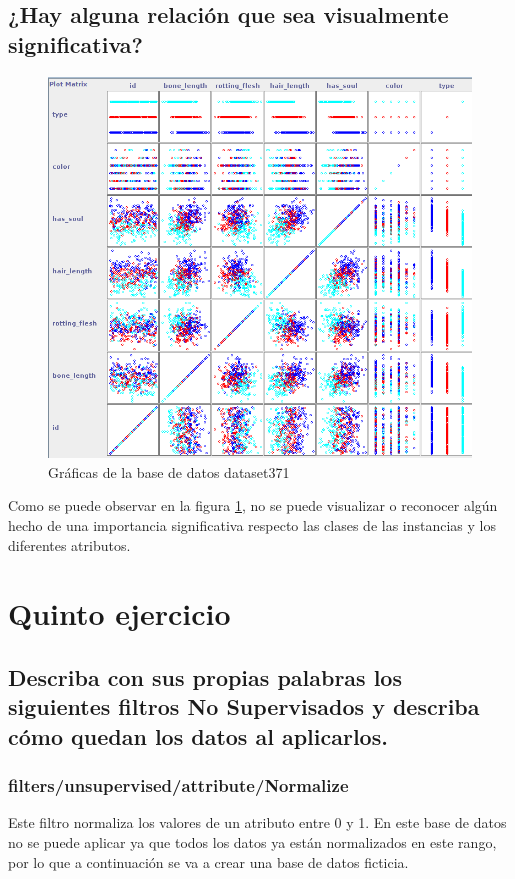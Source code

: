 \documentclass[11pt,twoside,a4paper]{book}
\begin{document}
\section{¿Hay alguna relación que sea visualmente \break significativa?}
\begin{figure}[H]
   \includegraphics[width=\textwidth]{ejercicio4_5.png}
	\caption{Gráficas de la base de datos dataset371}
	\label{Fig10}
\end{figure}
Como se puede observar en la figura \ref{Fig10}, no se puede visualizar o reconocer
algún hecho de una importancia significativa respecto las clases de las instancias
y los diferentes atributos.

\chapter{Quinto ejercicio}
\section{Describa con sus propias palabras los siguientes \break filtros No Supervisados y describa cómo quedan los datos al aplicarlos.}
\subsection{filters/unsupervised/attribute/Normalize}
Este filtro normaliza los valores de un atributo entre 0 y 1. En este base de datos
no se puede aplicar ya que todos los datos ya están normalizados en este rango, por
lo que a continuación se va a crear una base de datos ficticia.
\end{document}

